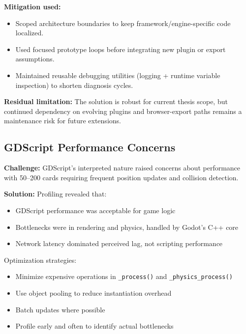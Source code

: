 \textbf{Mitigation used:}
\begin{itemize}
    \item Scoped architecture boundaries to keep framework/engine-specific code localized.
    \item Used focused prototype loops before integrating new plugin or export assumptions.
    \item Maintained reusable debugging utilities (logging + runtime variable inspection) to shorten diagnosis cycles.
\end{itemize}

\textbf{Residual limitation:}
The solution is robust for current thesis scope, but continued dependency on evolving plugins and browser-export paths remains a maintenance risk for future extensions.

\subsection{GDScript Performance Concerns}
\label{subsec:gdscript-performance}

\textbf{Challenge:} GDScript's interpreted nature raised concerns about performance with 50--200 cards requiring frequent position updates and collision detection.

\textbf{Solution:} Profiling revealed that:
\begin{itemize}
    \item GDScript performance was acceptable for game logic
    \item Bottlenecks were in rendering and physics, handled by Godot's C++ core
    \item Network latency dominated perceived lag, not scripting performance
\end{itemize}

Optimization strategies:
\begin{itemize}
    \item Minimize expensive operations in \texttt{\_process()} and \texttt{\_physics\_process()}
    \item Use object pooling to reduce instantiation overhead
    \item Batch updates where possible
    \item Profile early and often to identify actual bottlenecks
\end{itemize}

